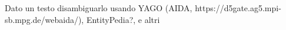 Dato un testo disambiguarlo usando YAGO (AIDA, https://d5gate.ag5.mpi-sb.mpg.de/webaida/), EntityPedia?, e altri
